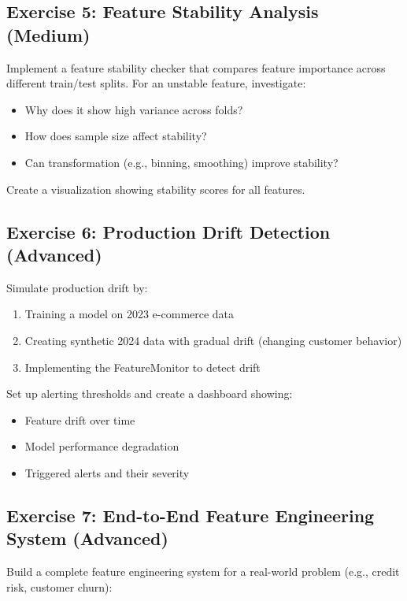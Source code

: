 \subsection{Exercise 5: Feature Stability Analysis (Medium)}

Implement a feature stability checker that compares feature importance across different train/test splits. For an unstable feature, investigate:
\begin{itemize}
    \item Why does it show high variance across folds?
    \item How does sample size affect stability?
    \item Can transformation (e.g., binning, smoothing) improve stability?
\end{itemize}

Create a visualization showing stability scores for all features.

\subsection{Exercise 6: Production Drift Detection (Advanced)}

Simulate production drift by:
\begin{enumerate}
    \item Training a model on 2023 e-commerce data
    \item Creating synthetic 2024 data with gradual drift (changing customer behavior)
    \item Implementing the FeatureMonitor to detect drift
\end{enumerate}

Set up alerting thresholds and create a dashboard showing:
\begin{itemize}
    \item Feature drift over time
    \item Model performance degradation
    \item Triggered alerts and their severity
\end{itemize}

\subsection{Exercise 7: End-to-End Feature Engineering System (Advanced)}

Build a complete feature engineering system for a real-world problem (e.g., credit risk, customer churn):

